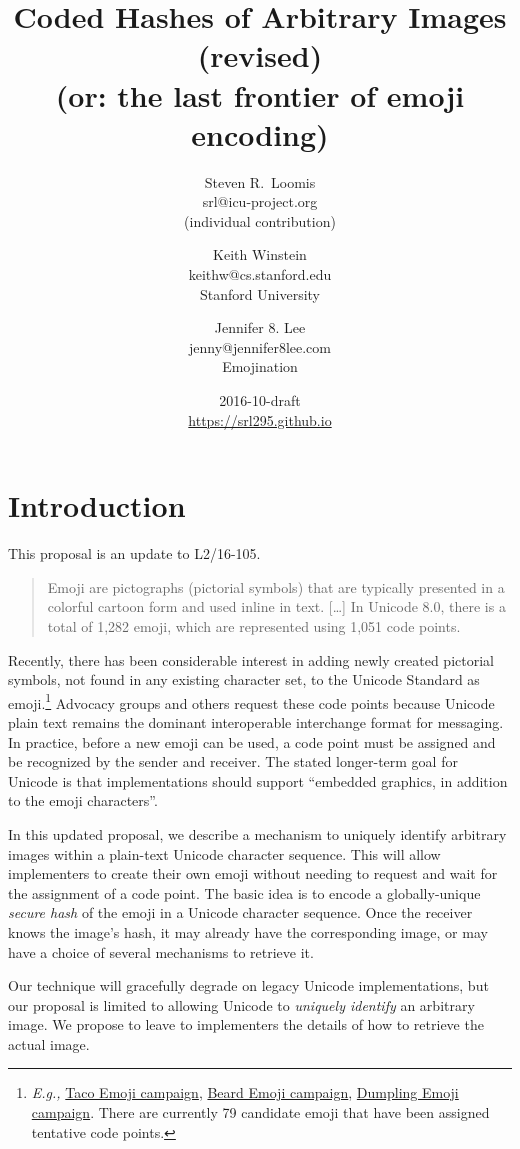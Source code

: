 \documentclass[12pt]{article}
\title{Coded Hashes of Arbitrary Images (revised)\\\normalsize \sf (or: the last frontier of emoji encoding)}
\author{
Steven R.~Loomis\\
\small srl@icu-project.org\\
\small (individual contribution)\\
\and
Keith Winstein\\
\small keithw@cs.stanford.edu\\
\small Stanford University\\
\and
Jennifer 8. Lee\\
\small jenny@jennifer8lee.com\\
\small Emojination\\
}
\date{2016-10-draft\\\small\url{https://srl295.github.io}}                                           %
\begin{document}
\maketitle

\section{Introduction}

This proposal is an update to L2/16-105\autocite{L216105}.

\begin{quote}
Emoji are pictographs (pictorial symbols) that are typically presented
in a colorful cartoon form and used inline in text. [\ldots] In
Unicode 8.0, there is a total of 1,282 emoji, which are represented
using 1,051 code points.\autocite{UTR51}
\end{quote}

Recently, there has been considerable interest in adding newly created
pictorial symbols, not found in any existing character set, to the
Unicode Standard as emoji.\footnote{\textit{E.g.,}
  \href{https://www.change.org/p/unicode-consortium-the-taco-emoji-needs-to-happen-aeb4ebc7-a323-441d-90b9-20b90c83a8c6}{Taco
    Emoji campaign}, \href{http://www.beardemoji.com/}{Beard Emoji
    campaign}, \href{http://www.dumplingemoji.org}{Dumpling Emoji
    campaign}. There are currently 79 candidate emoji that have been
  assigned tentative code points.} Advocacy groups and others request
these code points because Unicode plain text remains the dominant
interoperable interchange format for messaging. In practice, before a
new emoji can be used, a code point must be assigned and be recognized
by the sender and receiver. The stated longer-term goal for Unicode is
that implementations should support ``embedded graphics, in addition
to the emoji characters''\autocite[Section 8, ``Longer Term
  Solutions'']{UTR51}.
  
In this updated proposal, we describe a mechanism to uniquely identify
arbitrary images within a plain-text Unicode character sequence. This
will allow implementers to create their own emoji without needing to
request and wait for the assignment of a code point. The basic idea is
to encode a globally-unique \emph{secure hash} of the emoji in a
Unicode character sequence. Once the receiver knows the image's hash,
it may already have the corresponding image, or may have a choice of
several mechanisms to retrieve it.

Our technique will gracefully degrade on legacy Unicode
implementations, but our proposal is limited to allowing Unicode to
\emph{uniquely identify} an arbitrary image. We propose to leave to
implementers the details of how to retrieve the actual image.
\end{document}
